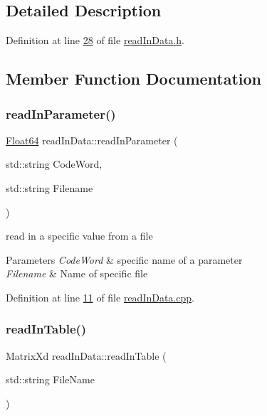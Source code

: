 \subsection{Detailed Description}


Definition at line \hyperlink{read_in_data_8h_source_l00028}{28} of file \hyperlink{read_in_data_8h_source}{read\+In\+Data.\+h}.



\subsection{Member Function Documentation}
\mbox{\label{classread_in_data_a9ae979e74958b43424cb6cf4a22043d7}} 
\subsubsection{\texorpdfstring{read\+In\+Parameter()}{readInParameter()}}
{\footnotesize\ttfamily \hyperlink{group___tools_ga3f1431cb9f76da10f59246d1d743dc2c}{Float64} read\+In\+Data\+::read\+In\+Parameter (\begin{DoxyParamCaption}\item[{std\+::string}]{Code\+Word,  }\item[{std\+::string}]{Filename }\end{DoxyParamCaption})}



read in a specific value from a file 


\begin{DoxyParams}{Parameters}
{\em Code\+Word} & specific name of a parameter \\
\hline
{\em Filename} & Name of specific file \\
\hline
\end{DoxyParams}


Definition at line \hyperlink{read_in_data_8cpp_source_l00011}{11} of file \hyperlink{read_in_data_8cpp_source}{read\+In\+Data.\+cpp}.

\mbox{\label{classread_in_data_af616573832efc2c27f07f5f6877b1386}} 
\subsubsection{\texorpdfstring{read\+In\+Table()}{readInTable()}}
{\footnotesize\ttfamily Matrix\+Xd read\+In\+Data\+::read\+In\+Table (\begin{DoxyParamCaption}\item[{std\+::string}]{File\+Name }\end{DoxyParamCaption})}




